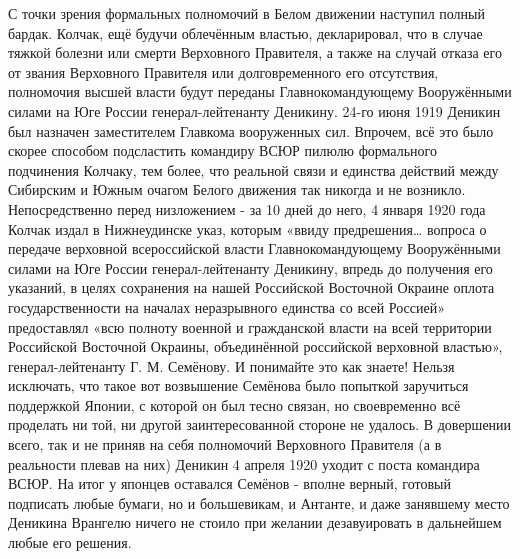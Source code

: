 С точки зрения формальных полномочий в Белом движении наступил полный бардак. Колчак, ещё будучи облечённым властью, декларировал, что в случае тяжкой болезни или смерти Верховного Правителя, а также на случай отказа его от звания Верховного Правителя или долговременного его отсутствия, полномочия высшей власти будут переданы Главнокомандующему Вооружёнными силами на Юге России генерал-лейтенанту Деникину. 24-го июня 1919 Деникин был назначен заместителем Главкома вооруженных сил. Впрочем, всё это было скорее способом подсластить командиру ВСЮР пилюлю формального подчинения Колчаку, тем более, что реальной связи и единства действий между Сибирским и Южным очагом Белого движения так никогда и не возникло. Непосредственно перед низложением - за 10 дней до него, 4 января 1920 года Колчак издал в Нижнеудинске указ, которым «ввиду предрешения… вопроса о передаче верховной всероссийской власти Главнокомандующему Вооружёнными силами на Юге России генерал-лейтенанту Деникину, впредь до получения его указаний, в целях сохранения на нашей Российской Восточной Окраине оплота государственности на началах неразрывного единства со всей Россией» предоставлял «всю полноту военной и гражданской власти на всей территории Российской Восточной Окраины, объединённой российской верховной властью», генерал-лейтенанту Г. М. Семёнову. И понимайте это как знаете! Нельзя исключать, что такое вот возвышение Семёнова было попыткой заручиться поддержкой Японии, с которой он был тесно связан, но своевременно всё проделать ни той, ни другой заинтересованной стороне не удалось. В довершении всего, так и не приняв на себя полномочий Верховного Правителя (а в реальности плевав на них) Деникин 4 апреля 1920 уходит с поста командира ВСЮР. На итог у японцев оставался Семёнов - вполне верный, готовый подписать любые бумаги, но и большевикам, и Антанте, и даже занявшему место Деникина Врангелю ничего не стоило при желании дезавуировать в дальнейшем любые его решения.

